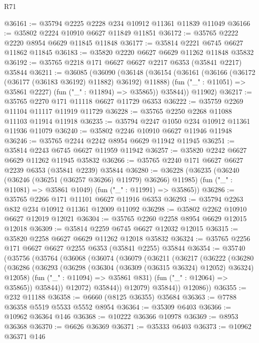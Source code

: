 \begin{lexlean}{R71}
\begin{coremodule}
@36161 := @35794 @2225 @2228 @234 @10912 @11361 @11839 @11049
@36166 := @35802 @2224 @10910 @6627 @11849 @11851
@36172 := @35765 @2222 @2220 @8954 @6629 @11845 @11848
@36177 := @35814 @2221 @6745 @6627 @11862 @11845
@36183 := @35820 @2220 @6627 @6629 @11262 @11848 @35832
@36192 := @35765 @2218 @171 @6627 @6627 @2217 @6353 (@35841 @2217) @35844
@36211 := @36085
    (@36090
      (@36148
        (@36154
          (@36161
            (@36166 (@36172 (@36177 (@36183 @36192) @11882) @36192) @11888)
            (fun ("_" : @11051) => @35861 @2227)
            (fun ("_" : @11894) => @35865))
          @35844))
      @11902)
@36217 := @35765 @2270 @171 @11118 @6627 @11729 @6353
@36222 := @35759 @2269 @11104 @11117 @11919 @11729
@36228 := @35765 @2250 @2268 @11088 @11103 @11914 @11918
@36235 := @35794 @2247 @1050 @234 @10912 @11361 @11936 @11079
@36240 := @35802 @2246 @10910 @6627 @11946 @11948
@36246 := @35765 @2244 @2242 @8954 @6629 @11942 @11945
@36251 := @35814 @2243 @6745 @6627 @11959 @11942
@36257 := @35820 @2242 @6627 @6629 @11262 @11945 @35832
@36266 := @35765 @2240 @171 @6627 @6627 @2239 @6353 (@35841 @2239) @35844
@36280 := @36228
    (@36235
      (@36240 (@36246 (@36251 (@36257 @36266) @11979) @36266) @11985)
      (fun ("_" : @11081) => @35861 @1049)
      (fun ("_" : @11991) => @35865))
@36286 := @35765 @2266 @171 @11101 @6627 @11916 @6353
@36293 := @35794 @2263 @832 @234 @10912 @11361 @12009 @11092
@36298 := @35802 @2262 @10910 @6627 @12019 @12021
@36304 := @35765 @2260 @2258 @8954 @6629 @12015 @12018
@36309 := @35814 @2259 @6745 @6627 @12032 @12015
@36315 := @35820 @2258 @6627 @6629 @11262 @12018 @35832
@36324 := @35765 @2256 @171 @6627 @6627 @2255 @6353 (@35841 @2255) @35844
@36354 := @35740
    (@35756
      (@35764
        (@36068
          (@36074
            (@36079
              (@36211
                (@36217
                  (@36222
                    (@36280
                      (@36286
                        (@36293
                          (@36298 (@36304 (@36309 (@36315 @36324) @12052) @36324) @12058)
                          (fun ("_" : @11094) => @35861 @831)
                          (fun ("_" : @12064) => @35865))
                        @35844))
                    @12072)
                  @35844))
              @12079)
            @35844))
        @12086))
@36355 := @232 @11188
@36358 := @6660 (@8125 @36355) @35684
@36363 := @7788 @36358 @5519 @5533 @5552 @8954
@36364 := @35309 @6403
@36366 := @10962 @36364 @146
@36368 := @10222 @36366 @10978
@36369 := @8953 @36368
@36370 := @6626 @36369
@36371 := @35333 @6403
@36373 := @10962 @36371 @146

\end{coremodule}
\end{lexlean}
